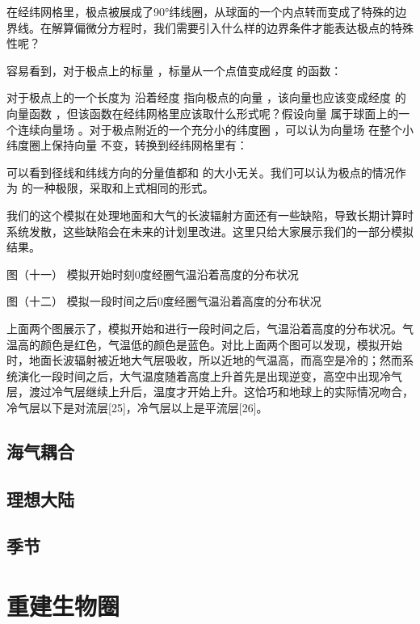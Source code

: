 \documentclass[a4paper,10.5pt]{book}
\begin{document}
在经纬网格里，极点被展成了90°纬线圈，从球面的一个内点转而变成了特殊的边界线。在解算偏微分方程时，我们需要引入什么样的边界条件才能表达极点的特殊性呢？

容易看到，对于极点上的标量  ，标量从一个点值变成经度  的函数：



对于极点上的一个长度为  沿着经度  指向极点的向量  ，该向量也应该变成经度  的向量函数  ，但该函数在经纬网格里应该取什么形式呢？假设向量  属于球面上的一个连续向量场  。对于极点附近的一个充分小的纬度圈 ，可以认为向量场  在整个小纬度圈上保持向量  不变，转换到经纬网格里有：



可以看到径线和纬线方向的分量值都和  的大小无关。我们可以认为极点的情况作为  的一种极限，采取和上式相同的形式。

我们的这个模拟在处理地面和大气的长波辐射方面还有一些缺陷，导致长期计算时系统发散，这些缺陷会在未来的计划里改进。这里只给大家展示我们的一部分模拟结果。


图（十一）
模拟开始时刻0度经圈气温沿着高度的分布状况



图（十二）
模拟一段时间之后0度经圈气温沿着高度的分布状况

上面两个图展示了，模拟开始和进行一段时间之后，气温沿着高度的分布状况。气温高的颜色是红色，气温低的颜色是蓝色。对比上面两个图可以发现，模拟开始时，地面长波辐射被近地大气层吸收，所以近地的气温高，而高空是冷的；然而系统演化一段时间之后，大气温度随着高度上升首先是出现逆变，高空中出现冷气层，渡过冷气层继续上升后，温度才开始上升。这恰巧和地球上的实际情况吻合，冷气层以下是对流层[25]，冷气层以上是平流层[26]。

\section{海气耦合}

\section{理想大陆}

\section{季节}



\chapter{重建生物圈}
\end{document}
